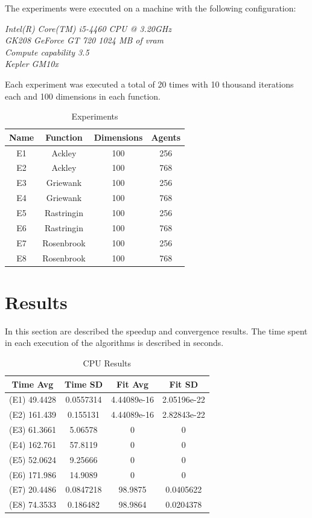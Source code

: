 \documentclass[conference]{IEEEtran}
\begin{document}
The experiments were executed on a machine with the following configuration:

\textit{Intel(R) Core(TM) i5-4460  CPU @ 3.20GHz \\ GK208 GeForce GT 720 1024 MB of vram \\ Compute capability 3.5 \\ Kepler GM10x}

Each experiment was executed a total of 20 times with 10 thousand
iterations each and 100 dimensions in each function.

\begin{table}[!htbp]
    \renewcommand{\arraystretch}{1.3}
    \caption{Experiments}
    \label{experiments}
    \centering
    \begin{tabular}{c|c|c|c}
    \hline
        \bf Name & Function &  Dimensions & Agents\\
    \hline
        E1 & Ackley & 100 & 256\\
        E2 & Ackley & 100 & 768\\
        E3 & Griewank & 100 & 256\\
        E4 & Griewank & 100 & 768\\
        E5 & Rastringin & 100 & 256\\
        E6 & Rastringin & 100 & 768\\
        E7 & Rosenbrook & 100 & 256\\
        E8 & Rosenbrook & 100 & 768\\
    \end{tabular}
\end{table}

\section{Results} \label{results}%

In this section are described the speedup and convergence results. The
time spent in each execution of the algorithms is described in seconds.

\begin{table}[!t]
    \renewcommand{\arraystretch}{1.3}
    \caption{CPU Results}
    \label{results-cpu}
    \centering
    \begin{tabular}{c|c|c|c}
    \hline
        Time Avg & Time SD & Fit Avg & Fit SD\\
    \hline
        (E1) 49.4428 & 0.0557314 & 4.44089e-16 & 2.05196e-22 \\
        (E2) 161.439 & 0.155131 & 4.44089e-16 & 2.82843e-22 \\
        (E3) 61.3661 & 5.06578   & 0  & 0 \\
        (E4) 162.761 & 57.8119 & 0 & 0 \\
        (E5) 52.0624 & 9.25666   & 0  & 0 \\
        (E6) 171.986 & 14.9089 & 0 & 0 \\
        (E7) 20.4486 & 0.0847218 & 98.9875 & 0.0405622 \\
        (E8) 74.3533 & 0.186482 & 98.9864 & 0.0204378 \\
    \end{tabular}
\end{table}
\end{document}
